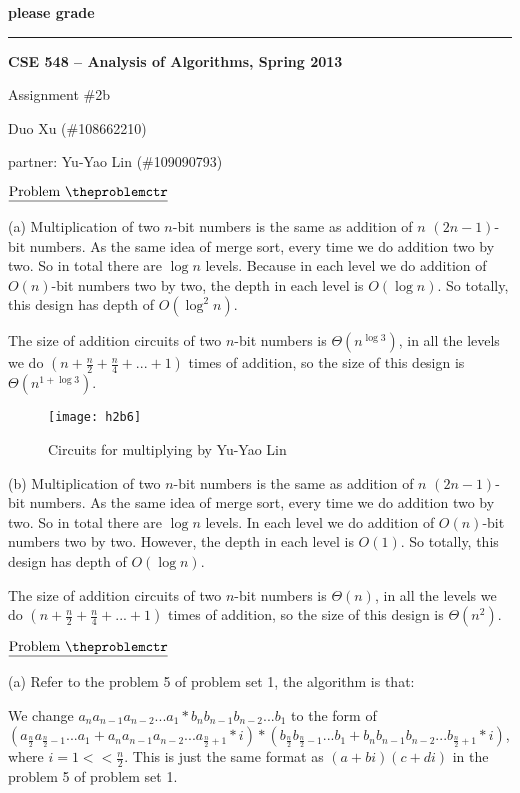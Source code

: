 \documentclass[11pt]{article}
\def\pp{\par\noindent}
\begin{document}
\centerline{\bf please grade}
\medskip
\hrule
\bigskip
\centerline{\bf CSE 548 -- Analysis of Algorithms, Spring 2013}
\medskip
\centerline{Assignment \#2b}
\medskip
\centerline{Duo Xu (\#108662210)}
\medskip
\centerline{partner: Yu-Yao Lin (\#109090793)}
\bigskip
\bigskip


\addtocounter{problemctr}{6}
\bigskip
\noindent
$\underline{\rm Problem\ \theproblemctr}$\pp

\noindent
(a) Multiplication of two $n$-bit numbers is the same as addition of $n$ $(2n-1)$-bit numbers. As the same idea of merge sort, every time we do addition two by two. So in total there are $\log n$ levels. Because in each level we do addition of $O(n)$-bit numbers two by two, the depth in each level is $O(\log n)$. So totally, this design has depth of $O(\log^2 n)$.

The size of addition circuits of two $n$-bit numbers is $\Theta(n^{\log 3})$, in all the levels we do $(n+\frac{n}{2}+\frac{n}{4}+...+1)$ times of addition, so the size of this design is $\Theta(n^{1+\log 3})$.

\begin{figure}[htpb]
\centering
\texttt{[image: h2b6]}
\caption{Circuits for multiplying by Yu-Yao Lin}
\end{figure}

\noindent
(b) Multiplication of two $n$-bit numbers is the same as addition of $n$ $(2n-1)$-bit numbers. As the same idea of merge sort, every time we do addition two by two. So in total there are $\log n$ levels. In each level we do addition of $O(n)$-bit numbers two by two. However, the depth in each level is $O(1)$. So totally, this design has depth of $O(\log n)$.

The size of addition circuits of two $n$-bit numbers is $\Theta(n)$, in all the levels we do $(n+\frac{n}{2}+\frac{n}{4}+...+1)$ times of addition, so the size of this design is $\Theta(n^2)$.

\vfill
\newpage
\addtocounter{problemctr}{1}
\bigskip
\noindent
$\underline{\rm Problem\ \theproblemctr}$\pp

\noindent
(a) Refer to the problem 5 of problem set 1, the algorithm is that:

We change $a_n a_{n-1} a_{n-2} ... a_1 * b_n b_{n-1} b_{n-2} ... b_1$ to the form of $(a_{\frac{n}{2}} a_{\frac{n}{2}-1} ... a_1 + a_n a_{n-1} a_{n-2} ... a_{\frac{n}{2}+1} * i) * (b_{\frac{n}{2}} b_{\frac{n}{2}-1} ... b_1 + b_n b_{n-1} b_{n-2} ... b_{\frac{n}{2}+1} * i)$, where $i = 1<<\frac{n}{2}$. This is just the same format as $(a+bi)(c+di)$ in the problem 5 of problem set 1.
\end{document}
